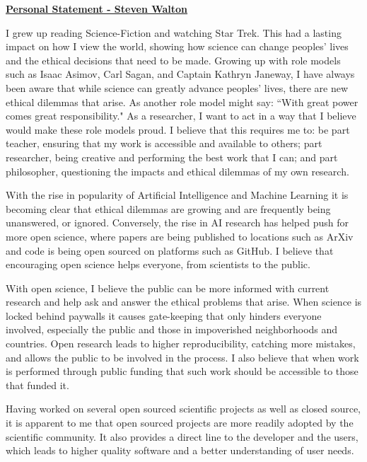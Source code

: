 \documentclass[12pt]{article}
\begin{document}
\begin{center}
\underline{\bf Personal Statement - Steven Walton}\\
\end{center}

I grew up reading Science-Fiction and watching Star Trek. This had a lasting
impact on how I view the world, showing how science can change peoples' lives
and the ethical decisions that need to be made. Growing up with role models such
as Isaac Asimov, Carl Sagan, and Captain Kathryn Janeway, I have always been
aware that while science can greatly advance peoples' lives, there are new
ethical dilemmas that arise. As another role model might say: ``With great power
comes great responsibility." As a researcher, I want to act in a way that I
believe would make these role models proud. I believe that this requires me to:
be part teacher, ensuring that my work is accessible and available to others;
part researcher, being creative and performing the best work that I can; and
part philosopher, questioning the impacts and ethical dilemmas of my own
research.

With the rise in popularity of Artificial Intelligence and Machine Learning it
is becoming clear that ethical dilemmas are growing and are frequently being
unanswered, or ignored. Conversely, the rise in AI research has helped push for
more open science, where papers are being published to locations such as ArXiv
and code is being open sourced on platforms such as GitHub. I believe that 
encouraging open science helps everyone, from scientists to the public. 

With open science, I believe the public can be more informed with current
research and help ask and answer the ethical problems that arise. When 
science is locked behind paywalls it causes gate-keeping that only hinders
everyone involved, especially the public and those in impoverished neighborhoods
and countries. Open research leads to higher reproducibility, catching more
mistakes, and allows the public to be involved in the process. I also believe
that when work is performed through public funding that such work should be
accessible to those that funded it.

Having worked on several open sourced scientific projects as well as closed
source, it is apparent to me that open sourced projects are more readily adopted
by the scientific community. It also provides a direct line to the developer and
the users, which leads to higher quality software and a better understanding of
user needs. 
\end{document}
